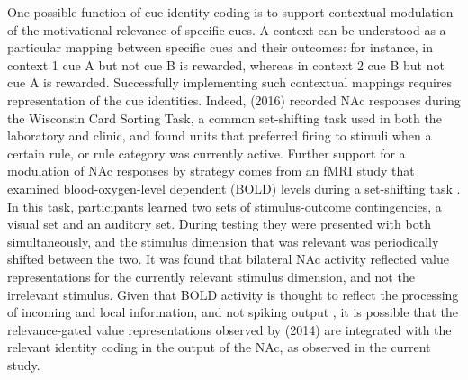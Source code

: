 \documentclass[11pt]{article}
\let\cite=\citep
\begin{document}
One possible function of cue identity coding is to support contextual
modulation of the motivational relevance of specific cues. A context
can be understood as a particular mapping between specific cues and
their outcomes: for instance, in context 1 cue A but not cue B is
rewarded, whereas in context 2 cue B but not cue A is
rewarded. Successfully implementing such contextual mappings requires
representation of the cue identities. Indeed, \citeauthor{Sleezer2016}
(2016) recorded NAc responses during the Wisconsin Card Sorting Task,
a common set-shifting task used in both the laboratory and clinic, and
found units that preferred firing to stimuli when a certain rule, or
rule category was currently active. Further support for a modulation
of NAc responses by strategy comes from an fMRI study that examined
blood-oxygen-level dependent (BOLD) levels during a set-shifting task
\cite{Fitzgerald2014}. In this task, participants learned two sets of
stimulus-outcome contingencies, a visual set and an auditory
set. During testing they were presented with both simultaneously, and
the stimulus dimension that was relevant was periodically shifted
between the two. It was found that bilateral NAc activity reflected
value representations for the currently relevant stimulus dimension,
and not the irrelevant stimulus. Given that BOLD activity is thought
to reflect the processing of incoming and local information, and not
spiking output \cite{Logothetis2001}, it is possible that the
relevance-gated value representations observed by
\citeauthor{Fitzgerald2014} (2014) are integrated with the relevant
identity coding in the output of the NAc, as observed in the current
study.
\end{document}
